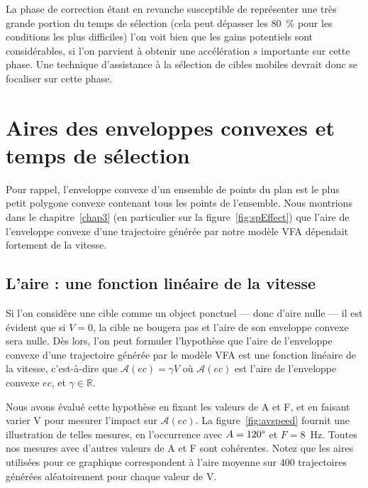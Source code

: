 	La phase de correction étant en revanche susceptible de représenter une très grande portion du temps de sélection (cela peut dépasser les 80~\%{} pour les conditions les plus difficiles) l'on voit bien que les gains potentiels sont considérables, si l'on parvient à obtenir une accélération $s$ importante sur cette phase. Une technique d'assistance à la sélection de cibles mobiles devrait donc se focaliser sur cette phase.
	
\section{Aires des enveloppes convexes et temps de sélection}
	Pour rappel, l'enveloppe convexe d'un ensemble de points du plan est le plus petit polygone convexe contenant tous les points de l'ensemble. Nous montrions dans le chapitre~\ref{chap3} (en particulier sur la figure~\ref{fig:spEffect}) que l'aire de l'enveloppe convexe d'une trajectoire générée par notre modèle VFA dépendait fortement de la vitesse.
	
	\subsection{L'aire : une fonction linéaire de la vitesse}
	Si l'on considère une cible comme un object ponctuel --- donc d'aire nulle --- il est évident que si $V = 0$, la cible ne bougera pas et l'aire de son enveloppe convexe sera nulle. Dès lors, l'on peut formuler l'hypothèse que l'aire de l'enveloppe convexe d'une trajectoire générée par le modèle VFA est une fonction linéaire de la vitesse, c'est-à-dire que $\mathcal{A}(ec) = \gamma{}V$ où $\mathcal{A}(ec)$ est l'aire de l'enveloppe convexe $ec$, et $\gamma \in \mathbb{R}$.
	
	Nous avons évalué cette hypothèse en fixant les valeurs de A et F, et en faisant varier V pour mesurer l'impact sur $\mathcal{A}(ec)$. La figure~\ref{fig:avspeed} fournit une illustration de telles mesures, en l'occurrence avec $A = 120\degree$ et $F = 8$~Hz. Toutes nos mesures avec d'autres valeurs de A et F sont cohérentes. Notez que les aires utilisées pour ce graphique correspondent à l'aire moyenne sur 400 trajectoires générées aléatoirement pour chaque valeur de V.
	
